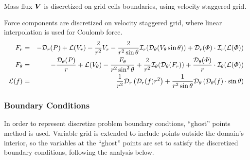 Mass flux $\boldsymbol{V}$ is discretized on grid cells boundaries, 
using velocity staggered grid.

Force components are discretized on velocity staggered grid, where
linear interpolation is used for Coulomb force.
\begin{eqnarray}
F_r &=& -\mathcal{D}_r(P) 
          + \mathcal{L}(V_r) - \frac{2}{r^2} V_r 
		  - \frac{2}{r^2 \sin\theta} \mathcal{I}_r(\mathcal{D}_\theta (V_\theta \sin\theta))
          + \mathcal{D}_r(\varPhi) \cdot \mathcal{I}_r(\mathcal{L}(\varPhi)) \\
F_\theta &=& -\frac{\mathcal{D}_\theta(P)}{r} 
		  + \mathcal{L}(V_\theta) - \frac{F_\theta}{r^2 \sin^2\theta} 
		  + \frac{2}{r^2} \mathcal{I}_\theta(\mathcal{D}_\theta(F_r))
		  + \frac{\mathcal{D}_\theta(\varPhi)}{r} \cdot \mathcal{I}_\theta(\mathcal{L}(\varPhi)) \\
\nonumber
\mathcal{L}(f) &=& \frac{1}{r^2}\mathcal{D}_r\left(\mathcal{D}_r(f) r^2\right) + 
\frac{1}{r^2 \sin\theta} \mathcal{D}_\theta\left(\mathcal{D}_\theta(f) \cdot \sin\theta\right)
\end{eqnarray}


\subsubsection{Boundary Conditions}
In order to represent discretize problem boundary condtions, 
``ghost'' points method is used. 
Variable grid is extended to include points outside the domain's interior,
so the variables at the ``ghost'' points are set to satisfy 
the discretized boundary conditions, following the analysis below.

